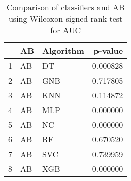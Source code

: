 \begin{table}
\footnotesize
\caption{Comparison of classifiers and AB using Wilcoxon signed-rank test for AUC}
\label{tab:AB wilcoxon AUC comparison}
\begin{tabular}{lllr}
\hline
 & AB & Algorithm & p-value \\
\hline
1 & AB & DT & 0.000828 \\
2 & AB & GNB & 0.717805 \\
3 & AB & KNN & 0.114872 \\
4 & AB & MLP & 0.000000 \\
5 & AB & NC & 0.000000 \\
6 & AB & RF & 0.670520 \\
7 & AB & SVC & 0.739959 \\
8 & AB & XGB & 0.000000 \\
\hline
\end{tabular}
\end{table}
